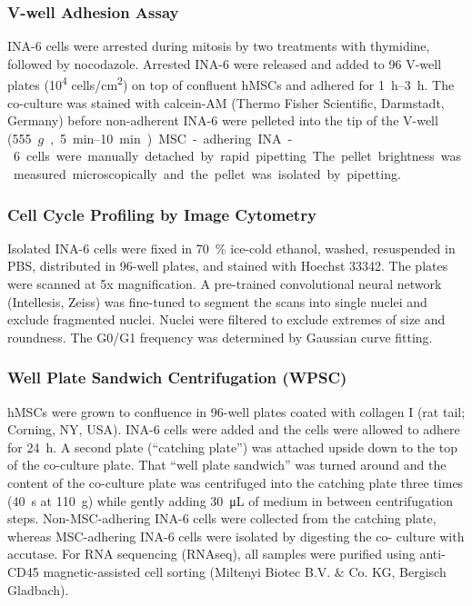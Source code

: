 \subsubsection*{V-well Adhesion Assay}
INA-6 cells were arrested during mitosis by two treatments with thymidine,
followed by nocodazole. Arrested INA-6 were released and added to 96 V-well
plates (10\textsuperscript{4} cells/cm\textsuperscript{2}) on top of confluent
hMSCs and adhered for \SIrange{1}{3}{\hour}. The co-culture was stained with
calcein-AM (Thermo Fisher Scientific, Darmstadt, Germany) before non-adherent
INA-6 were pelleted into the tip of the V-well (\SI{555}{$g$},
\SIrange{5}{10}{\minute}). MSC-adhering INA-6 cells were manually detached by
rapid pipetting. The pellet brightness was measured microscopically and the
pellet was isolated by pipetting.


\subsubsection*{Cell Cycle Profiling by Image Cytometry}
Isolated INA-6 cells were fixed in \SI{70}{\percent} ice-cold ethanol, washed, resuspended in PBS,
distributed in 96-well plates, and stained with Hoechst 33342. The plates were scanned at 5x
magnification. A pre-trained convolutional neural network (Intellesis, Zeiss) was fine-tuned to
segment the scans into single nuclei and exclude fragmented nuclei. Nuclei were filtered to
exclude extremes of size and roundness. The G0/G1 frequency was determined by Gaussian
curve fitting.


\subsubsection*{Well Plate Sandwich Centrifugation (WPSC)}
hMSCs were grown to confluence in 96-well plates coated with collagen I (rat
tail; Corning, NY, USA). INA-6 cells were added and the cells were allowed to
adhere for \SI{24}{\hour}. A second plate (``catching plate'') was attached
upside down to the top of the co-culture plate. That ``well plate sandwich'' was
turned around and the content of the co-culture plate was centrifuged into the
catching plate three times (\SI{40}{\second} at \SI{110}{g}) while gently adding
\SI{30}{\micro\liter} of medium in between centrifugation steps.
Non-MSC-adhering INA-6 cells were collected from the catching plate, whereas
MSC-adhering INA-6 cells were isolated by digesting the co- culture with
accutase. For RNA sequencing (RNAseq), all samples were purified using anti-CD45
magnetic-assisted cell sorting (Miltenyi Biotec B.V. \& Co. KG, Bergisch
Gladbach).

